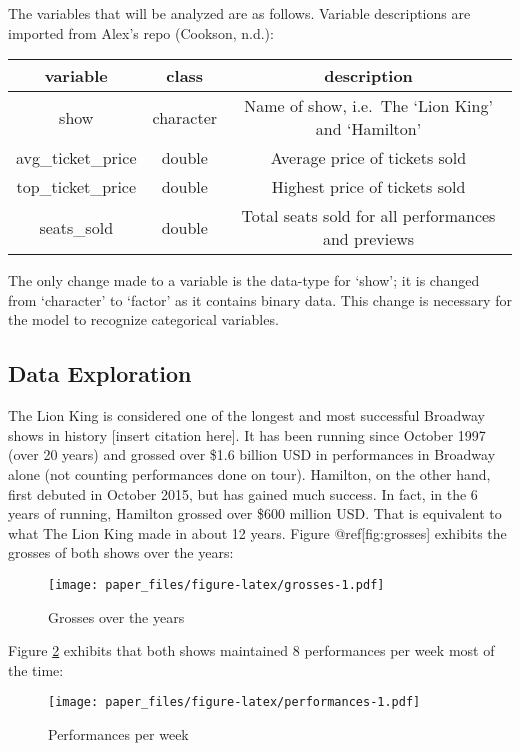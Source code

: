 \documentclass[
]{article}
\begin{document}
The variables that will be analyzed are as follows. Variable descriptions are imported from Alex's repo (Cookson, n.d.):

\begin{longtable}[]{@{}ccc@{}}
\toprule
variable & class & description\tabularnewline
\midrule
\endhead
show & character & Name of show, i.e.~The `Lion King' and `Hamilton'\tabularnewline
avg\_ticket\_price & double & Average price of tickets sold\tabularnewline
top\_ticket\_price & double & Highest price of tickets sold\tabularnewline
seats\_sold & double & Total seats sold for all performances and previews\tabularnewline
\bottomrule
\end{longtable}

The only change made to a variable is the data-type for `show'; it is changed from `character' to `factor' as it contains binary data. This change is necessary for the model to recognize categorical variables.

\hypertarget{data-exploration}{%
\subsection{Data Exploration}\label{data-exploration}}

The Lion King is considered one of the longest and most successful Broadway shows in history {[}insert citation here{]}. It has been running since October 1997 (over 20 years) and grossed over \$1.6 billion USD in performances in Broadway alone (not counting performances done on tour). Hamilton, on the other hand, first debuted in October 2015, but has gained much success. In fact, in the 6 years of running, Hamilton grossed over \$600 million USD. That is equivalent to what The Lion King made in about 12 years. Figure @ref{[}fig:grosses{]} exhibits the grosses of both shows over the years:

\begin{figure}
\centering
\texttt{[image: paper\_files/figure-latex/grosses-1.pdf]}
\caption{\label{fig:grosses}Grosses over the years}
\end{figure}

\newpage

Figure \ref{fig:performances} exhibits that both shows maintained 8 performances per week most of the time:

\begin{figure}
\centering
\texttt{[image: paper\_files/figure-latex/performances-1.pdf]}
\caption{\label{fig:performances}Performances per week}
\end{figure}
\end{document}
